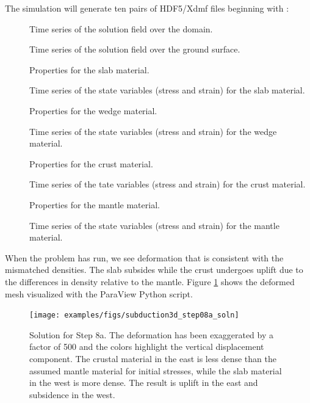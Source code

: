 The simulation will generate ten pairs of HDF5/Xdmf files beginning
with :
\begin{description}
\item[] Time series of the solution field over the domain.
\item[] Time series of the solution field over the ground surface.
\item[] Properties for
  the slab material.
\item[] Time series of the state variables (stress and strain) for the slab material.
\item[] Properties for
  the wedge material.
\item[] Time series of the state variables (stress and strain) for the wedge material.
\item[] Properties for
  the crust material.
\item[] Time series of the tate variables
  (stress and strain) for the crust material.
\item[] Properties for
  the mantle material.
\item[] Time series of the state variables
  (stress and strain) for the mantle material.
\end{description}

When the problem has run, we see deformation that is consistent with
the mismatched densities. The slab subsides while the crust undergoes
uplift due to the differences in density relative to the mantle. Figure
\ref{fig:example:subduction:3d:step08a} shows the deformed mesh
visualized with the  ParaView Python
script.

\begin{figure}
  \texttt{[image: examples/figs/subduction3d\_step08a\_soln]}
  \caption{Solution for Step 8a. The deformation has been exaggerated
    by a factor of 500 and the colors highlight the vertical
    displacement component. The crustal material in the
    east is less dense than the assumed mantle material for initial
    stresses, while the slab material in the west is more dense. The
    result is uplift in the east and subsidence in the west.}
  \label{fig:example:subduction:3d:step08a}
\end{figure}

